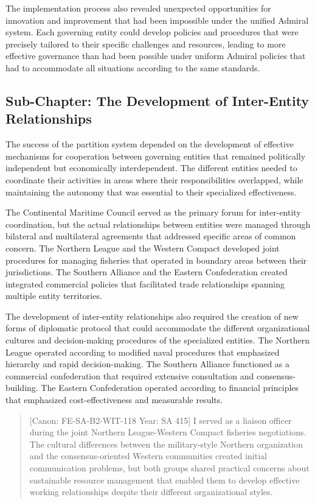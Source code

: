 The implementation process also revealed unexpected opportunities for
innovation and improvement that had been impossible under the unified
Admiral system. Each governing entity could develop policies and
procedures that were precisely tailored to their specific challenges and
resources, leading to more effective governance than had been possible
under uniform Admiral policies that had to accommodate all situations
according to the same standards.

\subsection{Sub-Chapter: The Development of Inter-Entity
Relationships}\label{sub-chapter-the-development-of-inter-entity-relationships}

The success of the partition system depended on the development of
effective mechanisms for cooperation between governing entities that
remained politically independent but economically interdependent. The
different entities needed to coordinate their activities in areas where
their responsibilities overlapped, while maintaining the autonomy that
was essential to their specialized effectiveness.

The Continental Maritime Council served as the primary forum for
inter-entity coordination, but the actual relationships between entities
were managed through bilateral and multilateral agreements that
addressed specific areas of common concern. The Northern League and the
Western Compact developed joint procedures for managing fisheries that
operated in boundary areas between their jurisdictions. The Southern
Alliance and the Eastern Confederation created integrated commercial
policies that facilitated trade relationships spanning multiple entity
territories.

The development of inter-entity relationships also required the creation
of new forms of diplomatic protocol that could accommodate the different
organizational cultures and decision-making procedures of the
specialized entities. The Northern League operated according to modified
naval procedures that emphasized hierarchy and rapid decision-making.
The Southern Alliance functioned as a commercial confederation that
required extensive consultation and consensus-building. The Eastern
Confederation operated according to financial principles that emphasized
cost-effectiveness and measurable results.

\begin{quote}
{[}Canon: FE-SA-B2-WIT-118 \textbar{} Year: SA 415{]} I served as a
liaison officer during the joint Northern League-Western Compact
fisheries negotiations. The cultural differences between the
military-style Northern organization and the consensus-oriented Western
communities created initial communication problems, but both groups
shared practical concerns about sustainable resource management that
enabled them to develop effective working relationships despite their
different organizational styles.
\end{quote}


